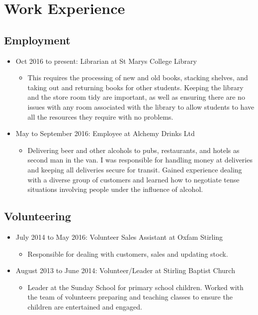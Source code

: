 \documentclass[10pt, a4paper]{article}
\begin{document}
\section{Work Experience}
	\subsection{Employment}
	\begin{itemize}
		\item Oct 2016 to present: Librarian at St Mary{\textquotesingle}s College Library
		\begin{itemize}
			\item This requires the processing of new and old books, stacking shelves, and taking out and returning books for other students. Keeping the library and the store room tidy are important, as well as ensuring there are no issues with any room associated with the library to allow students to have all the resources they require with no problems.
		\end{itemize}
		\item May to September 2016: Employee at Alchemy Drinks Ltd
		\begin{itemize}
			\item Delivering beer and other alcohols to pubs, restaurants, and hotels as second man in the van. I was responsible for handling money at deliveries and keeping all deliveries secure for transit. Gained experience dealing with a diverse group of customers and learned how to negotiate tense situations involving people under the influence of alcohol.
		\end{itemize}
	\end{itemize}
	\subsection{Volunteering}
	\begin{itemize}
		\item July 2014 to May 2016: Volunteer Sales Assistant at Oxfam Stirling
		\begin{itemize}
			\item Responsible for dealing with customers, sales and updating stock.
		\end{itemize}
		\item August 2013 to June 2014: Volunteer/Leader at Stirling Baptist Church
		\begin{itemize}
			\item Leader at the Sunday School for primary school children. Worked with the team of volunteers preparing and teaching classes to ensure the children are entertained and engaged.
		\end{itemize}
	\end{itemize}
\end{document}
